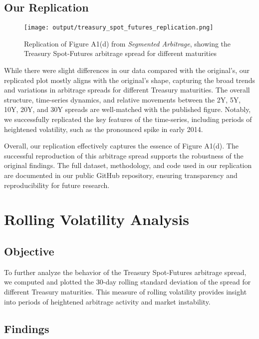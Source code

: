 \documentclass{article}
\begin{document}
\subsection{Our Replication}

\begin{figure}[h]
  \centering
  \texttt{[image: output/treasury\_spot\_futures\_replication.png]}
  \caption{Replication of Figure A1(d) from \textit{Segmented Arbitrage}, showing the Treasury Spot-Futures arbitrage spread for different maturities}
  \label{fig:treasury_spot_futures_replication}
\end{figure}




While there were slight differences in our data compared with the original's, our replicated plot mostly aligns with the original's shape, capturing the broad trends and variations in arbitrage spreads for different Treasury maturities. The overall structure, time-series dynamics, and relative movements between the 2Y, 5Y, 10Y, 20Y, and 30Y spreads are well-matched with the published figure. Notably, we successfully replicated the key features of the time-series, including periods of heightened volatility, such as the pronounced spike in early 2014.

Overall, our replication effectively captures the essence of Figure A1(d). The successful reproduction of this arbitrage spread supports the robustness of the original findings. The full dataset, methodology, and code used in our replication are documented in our public GitHub repository, ensuring transparency and reproducibility for future research.


\newpage


\section{Rolling Volatility Analysis}
\subsection{Objective}

To further analyze the behavior of the Treasury Spot-Futures arbitrage spread, we computed and plotted the 30-day rolling standard deviation of the spread for different Treasury maturities. This measure of rolling volatility provides insight into periods of heightened arbitrage activity and market instability.

\subsection{Findings}
\end{document}
